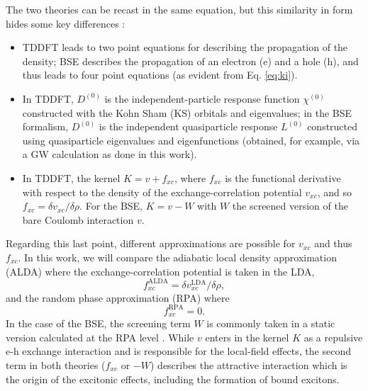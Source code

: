 \documentclass[aps,prb,10pt,showpacs,superscriptaddress,twocolumn,notitlepage]{revtex4-1}
\begin{document}
The two theories can be recast in the same equation, but this similarity in form
hides some key differences \cite{luciabook, sottilePRL03}:
\begin{itemize}
\item TDDFT leads to two point equations for describing the propagation of the
density; BSE describes the propagation of an electron (e) and a hole (h), and
thus leads to four point equations (as evident from  Eq. \eqref{eq:ki}).
\item In TDDFT, $D^{(0)}$ is the independent-particle response function
$\chi^{(0)}$ constructed with the Kohn Sham (KS) orbitals and eigenvalues; in
the BSE formalism, $D^{(0)}$ is the independent quasiparticle response $L^{(0)}$
constructed using quasiparticle eigenvalues and eigenfunctions (obtained, for
example, via a GW calculation as done in this work).
\item In TDDFT, the kernel $K = v + f_{xc}$, where $f_{xc}$ is the functional
derivative with respect to the density of the exchange-correlation potential
$v_{xc}$, and so $f_{xc} = \delta v_{xc}/\delta\rho$. For the BSE, $K = v - W$
with $W$ the screened version of the bare Coulomb interaction $v$.
\end{itemize}
Regarding this last point, different approximations are possible for $v_{xc}$
and thus $f_{xc}$. In this work, we will compare the adiabatic local density
approximation (ALDA) where the exchange-correlation potential is taken in the
LDA,
\begin{equation*}
f^{\mathrm{ALDA}}_{xc} = \delta v^{\mathrm{LDA}}_{xc}/\delta\rho,
\end{equation*} 
and the random phase approximation (RPA) where
\begin{equation*}
f^{\mathrm{RPA}}_{xc} = 0.
\end{equation*}
In the case of the BSE, the screening term $W$ is commonly taken in a static
version calculated at the RPA level \cite{onidaRMP02, luciabook}. While $v$
enters in the kernel $K$ as a repulsive e-h exchange interaction and is
responsible for the local-field effects, the second term in both theories
($f_{xc}$ or $-W$) describes the attractive interaction which is the origin of
the excitonic effects, including the formation of bound excitons.
 
\end{document}
